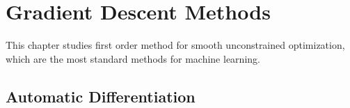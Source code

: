 
\chapter{Gradient Descent Methods}
\label{chap-conv-duality}


This chapter studies first order method for smooth unconstrained optimization, which are the most standard methods for machine learning. 






\section{Automatic Differentiation}



